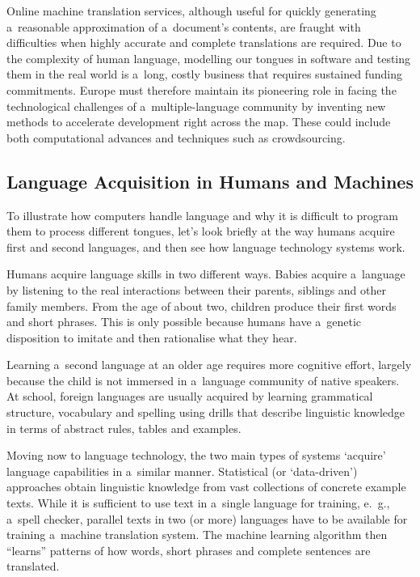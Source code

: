 \begin{multicols}{2}

Online machine translation services, although useful for quickly
generating a~reasonable approximation of a~document’s contents, are
fraught with difficulties when highly accurate and complete
translations are required. Due to the complexity of human language,
modelling our tongues in software and testing them in the real world
is a~long, costly business that requires sustained funding
commitments. Europe must therefore maintain its pioneering role in
facing the technological challenges of a~multiple-language community
by inventing new methods to accelerate development right across the
map. These could include both computational advances and techniques
such as crowdsourcing. 

\subsection{Language Acquisition in Humans and Machines} 

To illustrate how computers handle language and why it is difficult to
program them to process different tongues, let’s look briefly at the
way humans acquire first and second languages, and then see how
language technology systems work. 

Humans acquire language skills in two different ways. Babies acquire
a~language by listening to the real interactions between their
parents, siblings and other family members. From the age of about two,
children produce their first words and short phrases. This is only
possible because humans have a~genetic disposition to imitate and then
rationalise what they hear. 

Learning a~second language at an older age requires more cognitive
effort, largely because the child is not immersed in a~language
community of native speakers. At school, foreign languages are usually
acquired by learning grammatical structure, vocabulary and spelling
using drills that describe linguistic knowledge in terms of abstract
rules, tables and examples. 


Moving now to language technology, the two main types of systems
‘acquire’ language capabilities in a~similar manner. Statistical
(or ‘data-driven’) approaches obtain linguistic knowledge from
vast collections of concrete example texts. While it is sufficient to
use text in a~single language for training, e.\, g., a~spell checker,
parallel texts in two (or more) languages have to be available for
training a~machine translation system. The machine learning algorithm
then “learns” patterns of how words, short phrases and complete
sentences are translated. 


\end{multicols}
